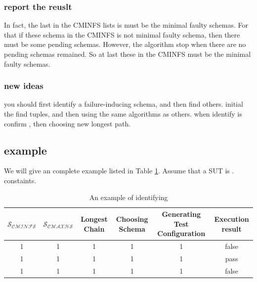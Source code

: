 \documentclass[10pt,journal,cspaper,compsoc]{IEEEtran}
\begin{document}
\subsubsection{report the reuslt}
In fact, the last in the CMINFS lists is must be the minimal faulty schemas. For that if these schema in the CMINFS is not minimal faulty schema, then there must be some pending schemas. However, the algorithm stop when there are no pending schemas remained. So at last these in the CMINFS must be the minimal faulty schemas.

\subsubsection{new ideas}
you should first identify a failure-inducing schema, and then find others. initial the find tuples, and then using the same algorithms as others. when identify is confirm ,  then choosing new longest path.

\subsection{example}
We will give an complete example listed in Table \ref{identifying_example}. Assume that a SUT is . constaints.
\begin{table}\renewcommand{\arraystretch}{1.3}
  \caption{An example of identifying} \centering
  \label{identifying_example}
  \begin{tabular}{c|c|c|c|c|c}\hline
  \hline
  \bfseries $\mathcal{S_{CMINFS}}$ &   \bfseries $\mathcal{S_{CMAXHS}}$ & \bfseries Longest Chain & \bfseries Choosing Schema & \bfseries Generating Test Configuration & \bfseries Execution result\\
  \hline
  1 & 1 & 1 & 1 & 1 & false \\
   1 & 1 & 1 & 1 & 1 & pass\\
  1 & 1 & 1 & 1 & 1 & false\\
  \hline
  \end{tabular}

\end{table}
\end{document}
